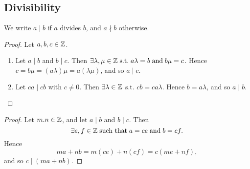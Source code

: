 \documentclass[11pt,openany]{article}
\begin{document}
\subsection{Divisibility}
\begin{remark*}
	We write $a\mid b$ if $a$ divides $b$, and $a\nmid b$ otherwise. 
\end{remark*}
\vfill
{}
\begin{proof}
	Let $a,b,c\in\mathbb{Z}$. \begin{enumerate}[(1)]
		\item Let $a\mid b$ and $b\mid c$. Then $\exists \lambda, \mu\in\mathbb{Z}\;\text{s.t.}\; a\lambda=b\;\text{and}\; b\mu=c$. Hence $c=b\mu=(a\lambda)\mu=a(\lambda\mu)$, and so $a\mid c$.
		\item Let $ca\mid cb$ with $c\neq 0$. Then $\exists \lambda\in\mathbb{Z}$ s.t. $cb=ca\lambda$. Hence $b=a\lambda$, and so $a\mid b$.
	\end{enumerate}
\end{proof}
\vfill
{}
\begin{proof}
	Let $m.n\in\mathbb{Z}$, and let $a\mid b$ and $b\mid c$. Then \[
	\exists e, f\in\mathbb{Z}\;\text{such that}\; a=ce\;\text{and}\; b=cf.
	\] Hence \[
	ma+nb=m(ce)+n(cf)=c(me+nf),
	\] and so $c\mid (ma+nb)$.
\end{proof}
\end{document}
